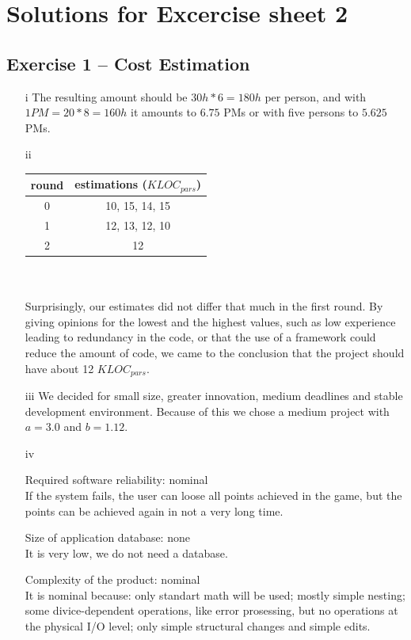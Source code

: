 \documentclass{scrartcl}
\begin{document}
\section*{Solutions for Excercise sheet 2}

\subsection*{Exercise 1 – Cost Estimation}
\begin{itemize}
	\item[i]
	The resulting amount should be $30h*6=180h$ per person, and with $1 PM=20*8=160h$ it amounts to $6.75$ PMs or with five persons to $5.625$ PMs.\\
	\item[ii]
	\begin{tabular} {| c | c |}
		round & estimations ($KLOC_{pars}$)\\
		\hline
		0 & 10, 15, 14, 15 \\
		1 & 12, 13, 12, 10\\
		2 & 12\\
	\end{tabular}\\\\
	Surprisingly, our estimates did not differ that much in the first round.
	By giving opinions for the lowest and the highest values, such as low experience leading to redundancy in the code, or that the use of a framework could reduce the amount of code, we came to the conclusion that the project should have about 12 $KLOC_{pars}$. 
	\item[iii]
	We decided for small size, greater innovation, medium deadlines and stable development environment. Because of this we chose a medium project with $a=3.0$ and $b=1.12$.\\
	\item[iv]
		\item[]Required software reliability: nominal \\ If the system fails, the user can loose all points achieved in the game, but the points can be achieved again in not a very long time.
		\item[]Size of application database:  none \\
		It is very low, we do not need a database.
		\item[]Complexity of the product:  nominal \\
		It is nominal because: only standart math will be used; mostly simple nesting; some divice-dependent operations, like error prosessing, but no operations at the physical I/O level; only simple structural changes and simple edits.

\end{itemize}
\end{document}
